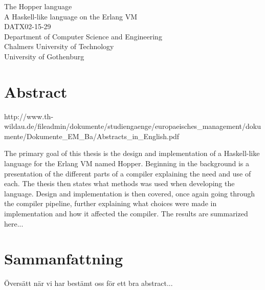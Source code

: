 The Hopper language\\
A Haskell-like language on the Erlang VM\\
DATX02-15-29\\
Department of Computer Science and Engineering\\
Chalmers University of Technology\\
University of Gothenburg\\

\thispagestyle{plain}			%
\section*{Abstract}



http://www.th-wildau.de/fileadmin/dokumente/studiengaenge/europaeisches_management/dokumente/Dokumente_EM_Ba/Abstracts_in_English.pdf


The primary goal of this thesis is the design and implementation of a Haskell-like language for the Erlang VM named Hopper.
Beginning in the background is a presentation of the different parts of a compiler explaining the need and use of each. The thesis then states what methods was used when developing the language. Design and implementation is then covered, once again going through the compiler pipeline, further explaining what choices were made in implementation and how it affected the compiler.
The results are summarized here...







\section*{Sammanfattning}
Översätt när vi har bestämt oss för ett bra abstract...



\newpage				%
\thispagestyle{empty}
\mbox{}